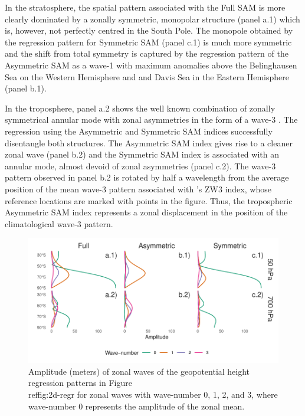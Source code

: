 \documentclass[]{ametsocV5}
\begin{document}
In the stratosphere, the spatial pattern associated with the Full SAM is more clearly dominated by a zonally symmetric, monopolar structure (panel a.1) which is, however, not perfectly centred in the South Pole. The monopole obtained by the regression pattern for Symmetric SAM (panel c.1) is much more symmetric and the shift from total symmetry is captured by the regression pattern of the Asymmetric SAM as a wave-1 with maximum anomalies above the Belinghausen Sea on the Western Hemisphere and and Davis Sea in the Eastern Hemisphere (panel b.1).

In the troposphere, panel a.2 shows the well known combination of zonally symmetrical annular mode with zonal asymmetries in the form of a wave-3 \citep{fogt2012}. The regression using the Asymmetric and Symmetric SAM indices successfully disentangle both structures. The Asymmetric SAM index gives rise to a cleaner zonal wave (panel b.2) and the Symmetric SAM index is associated with an annular mode, almost devoid of zonal asymmetries (panel c.2). The wave-3 pattern observed in panel b.2 is rotated by half a wavelength from the average position of the mean wave-3 pattern associated with \citet{raphael2004}'s ZW3 index, whose reference locations are marked with points in the figure. Thus, the tropospheric Asymmetric SAM index represents a zonal displacement in the position of the climatological wave-3 pattern.

\begin{figure}
\includegraphics{wave-amplitude-1} \caption[Amplitude (meters) of zonal waves of the geopotential height regression patterns in Figure \\ref{fig:2d-regr} for zonal waves with wave-number 0, 1, 2, and 3, where wave-number 0 represents the amplitude of the zonal mean]{Amplitude (meters) of zonal waves of the geopotential height regression patterns in Figure \\ref{fig:2d-regr} for zonal waves with wave-number 0, 1, 2, and 3, where wave-number 0 represents the amplitude of the zonal mean.}\label{fig:wave-amplitude}
\end{figure}
\end{document}
